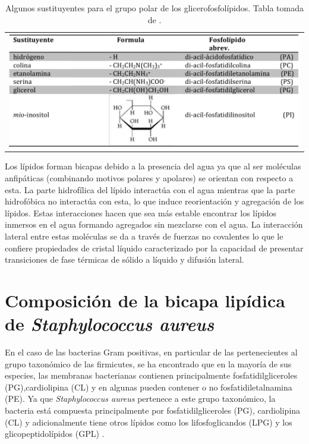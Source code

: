 \begin{table}[]
    \centering
    \begin{tabular}{c}
  \includegraphics[scale=0.4]{Kap2/headgroups.png}
    \end{tabular}
    \caption{Algunos sustituyentes para el grupo polar de los glicerofosfol\'{i}pidos. Tabla tomada de \cite{Bagatolli2017VidaGrasas}.}
    \label{tab:polar}
\end{table}

Los l\'{i}pidos forman bicapas debido a la presencia del agua ya que al ser mol\'{e}culas anfip\'{a}ticas (combinando motivos polares y apolares) se orientan con respecto a esta. La parte hidrof\'{i}lica del l\'{i}pido interact\'{u}a con el agua mientras que la parte hidrof\'{o}bica no interact\'{u}a con esta, lo que induce reorientaci\'{o}n y agregaci\'{o}n de los l\'{i}pidos. Estas interacciones hacen que sea m\'{a}s estable encontrar los l\'{i}pidos inmersos en el agua formando agregados sin mezclarse con el agua. La interacci\'on lateral entre estas mol\'eculas se da a trav\'es de fuerzas no covalentes lo que le confiere propiedades de cristal l\'iquido caracterizado por la capacidad de presentar transiciones de fase t\'{e}rmicas de s\'olido a l\'iquido y difusi\'{o}n lateral. \\
\section{Composici\'{o}n de la bicapa lip\'{i}dica de \textit{Staphylococcus aureus}}
En el caso de las bacterias Gram positivas, en particular de las pertenecientes al grupo taxon\'{o}mico de las firmicutes, se ha encontrado que en la mayor\'{i}a de sus especies, las membranas bacterianas contienen principalmente fosfatidilgliceroles (PG),cardiolipina (CL) y en algunas pueden contener o no fosfatidiletalnamina (PE). Ya que \textit{Staphylococcus aureus} pertenece a este grupo taxon\'{o}mico, la bacteria est\'{a} compuesta principalmente por fosfatidilgliceroles (PG), cardiolipina (CL) y adicionalmente tiene otros l\'{i}pidos como los lifosfoglicandos (LPG) y los glicopeptidol\'{i}pidos (GPL) \cite{Sohlenkamp2015BacterialPathways}. \\

